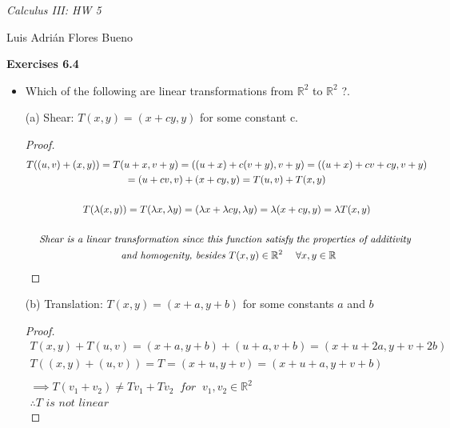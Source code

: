 \documentclass[10pt]{extarticle}
\newcommand{\reall}{\mathbb{R}}
\newcommand{\itembf}[1]{\item[\textbf{#1}]}
\begin{document}
	
	\begin{LARGE}
		\emph{Calculus III: HW 5}\centering\\
	\end{LARGE}	

	\begin{large}
		\begin{center}
			Luis Adrián Flores Bueno
		\end{center}
	\end{large}

	\begin{large}
		\textbf{Exercises 6.4 }
	\end{large}
		
		
		
	\begin{itemize}
		
		\itembf{2.} Which of the following are linear transformations from $\reall^2$ to $\reall^2$ ?.
		
		(a) Shear: $T(x,y)=(x+cy,y)$ for some constant c.
		
		 	\begin{proof}
		 		\begin{gather*}
		 			T((u,v)+(x,y))=T(u+x,v+y)=((u+x)+c(v+y),v+y)=((u+x)+cv+cy,v+y)
		 			\\=(u+cv,v)+(x+cy,y)=T(u,v)+T(x,y)
		 			\\
		 			\\
		 			T(\lambda(x,y))=T(\lambda x,\lambda y)=(\lambda x+ \lambda c y,\lambda y)=\lambda(x+cy,y)=\lambda T(x,y)
		 			\\
		 			\\
		 			\textit{Shear is a linear transformation since this function satisfy the properties of additivity
		 			}
		 			\\
		 			\textit{ and homogenity, besides  $ T(x,y) \in \reall^2 \; \quad \forall x,y\in \reall $}
		 		\end{gather*}
		 	\end{proof}
		(b) Translation: $   T(x,y)=(x+a,y+b)$ for some constants $ a$ and $b$
			
			\begin{proof}
				\begin{gather*}
					T(x,y)+T(u,v)=(x+a,y+b)+(u+a,v+b)=(x+u+2a,y+v+2b)
					\\
					T((x,y)+(u,v))=T=(x+u,y+v)=(x+u+a,y+v+b)
					\\
					\\
					\implies T(v_1+v_2)\neq Tv_1 +Tv_2\;\; for \; \; v_1,v_2\in\reall^2
					\\
					 \therefore \textit{T is not linear}
				\end{gather*}
			\end{proof}
		

\end{itemize}
\end{document}
